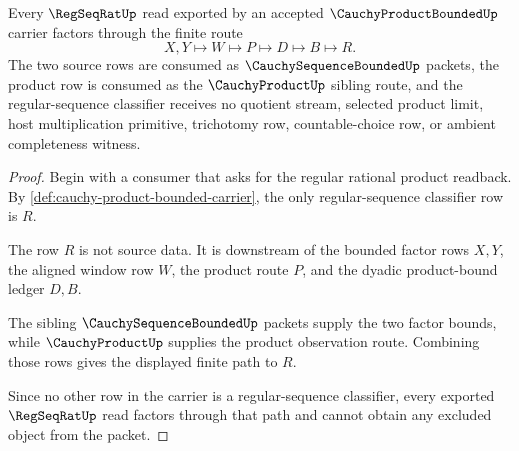 \begin{theorem}
\label{thm:cauchy-product-bounded-regseqrat-product-route}
Every $\RegSeqRatUp$ read exported by an accepted $\CauchyProductBoundedUp$ carrier factors through the finite route
$$
X,Y\longmapsto W\longmapsto P\longmapsto D\longmapsto B\longmapsto R .
$$
The two source rows are consumed as $\CauchySequenceBoundedUp$ packets, the product row is consumed as the $\CauchyProductUp$ sibling route, and the regular-sequence classifier receives no quotient stream, selected product limit, host multiplication primitive, trichotomy row, countable-choice row, or ambient completeness witness.
\end{theorem}
\begin{proof}
Begin with a consumer that asks for the regular rational product readback. By \autoref{def:cauchy-product-bounded-carrier}, the only regular-sequence classifier row is $R$.

The row $R$ is not source data. It is downstream of the bounded factor rows $X,Y$, the aligned window row $W$, the product route $P$, and the dyadic product-bound ledger $D,B$.

The sibling $\CauchySequenceBoundedUp$ packets supply the two factor bounds, while $\CauchyProductUp$ supplies the product observation route. Combining those rows gives the displayed finite path to $R$.

Since no other row in the carrier is a regular-sequence classifier, every exported $\RegSeqRatUp$ read factors through that path and cannot obtain any excluded object from the packet.
\end{proof}

